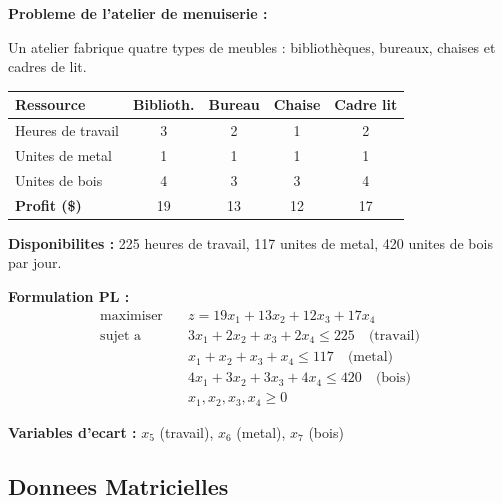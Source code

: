 \documentclass[12pt,a4paper]{article}
\begin{document}
\begin{exemple}
\textbf{Probleme de l'atelier de menuiserie :}

Un atelier fabrique quatre types de meubles : biblioth\`eques, bureaux, chaises et cadres de lit.

\begin{center}
\begin{tabular}{l|c|c|c|c}
\toprule
\textbf{Ressource} & Biblioth. & Bureau & Chaise & Cadre lit \\
\midrule
Heures de travail & 3 & 2 & 1 & 2 \\
Unites de metal & 1 & 1 & 1 & 1 \\
Unites de bois & 4 & 3 & 3 & 4 \\
\midrule
\textbf{Profit (\$)} & 19 & 13 & 12 & 17 \\
\bottomrule
\end{tabular}
\end{center}

\textbf{Disponibilites :} 225 heures de travail, 117 unites de metal, 420 unites de bois par jour.

\textbf{Formulation PL :}
\begin{align*}
\text{maximiser} \quad & z = 19x_1 + 13x_2 + 12x_3 + 17x_4\\
\text{sujet a} \quad & 3x_1 + 2x_2 + x_3 + 2x_4 \leq 225 \quad \text{(travail)}\\
& x_1 + x_2 + x_3 + x_4 \leq 117 \quad \text{(metal)}\\
& 4x_1 + 3x_2 + 3x_3 + 4x_4 \leq 420 \quad \text{(bois)}\\
& x_1, x_2, x_3, x_4 \geq 0
\end{align*}

\textbf{Variables d'ecart :} $x_5$ (travail), $x_6$ (metal), $x_7$ (bois)
\end{exemple}

\subsection{Donnees Matricielles}
\end{document}
